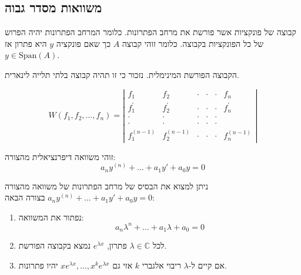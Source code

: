 \documentclass{tstextbook}
\begin{document}
\subsection{משוואות מסדר גבוה}

\begin{definition}
קבוצה של פונקציות אשר פורשת את מרחב הפתרונות. כלומר המרחב הפתרונות יהיה הפרוש של כל הפונקציות בקבוצה. כלומר זוהי קבוצה \(A\) כך שאם פונקציה \(y\) היא פתרון אז \(y \in \mathrm{Span}(A)\).

\end{definition}
\begin{definition}
הקבוצה הפורשת המינימלית. נזכור כי זו תהיה קבוצה בלתי תלייה לינארית.

\end{definition}
\begin{definition}[וורונסקיאן]
$$W(f_{1},f_{2},\ldots,f_{n})=\left|\begin{array}{cccc}f_{1}&f_{2}&\cdot&\cdot&\cdot&f_{n}\\ f_{1}^{\prime}&f_{2}^{\prime}&\cdot&\cdot&\cdot&f_{n}^{\prime}\\ \cdot&\cdot&\cdot&\cdot&\cdot\\ \cdot&\cdot&\cdot&\cdot&\cdot\\ f_{1}^{(n-1)}&f_{2}^{(n-1)}&\cdot&\cdot&\cdot&f_{n}^{(n-1)}\end{array}\right|$$

\end{definition}
\begin{definition}
זוהי משוואה דיפרנציאלית מהצורה:
$$a_n y^{(n)} + ...+ a_1 y' + a_0 y = 0$$

\end{definition}
\begin{proposition}
ניתן למצוא את הבסיס של מרחב הפתרונות של משוואה מהצורה \(a_n y^{(n)} + ...+ a_1 y' + a_0 y = 0\) בצורה הבאה:

  \begin{enumerate}
    \item נפתור את המשוואה: 
$$a_n \lambda^n + ... + a_1\lambda + a_0=0$$


    \item לכל \(\lambda \in \mathbb{C}\) פתרון, \(e^{\lambda x}\) נמצא בקבוצה הפורשת.  


    \item אם קיים ל-\(\lambda\) ריבוי אלגברי \(k\) אזי גם \(xe^{ \lambda x },\dots,x^{k}e^{ \lambda x }\) יהיו פתרונות. 


  \end{enumerate}
\end{proposition}
\end{document}
